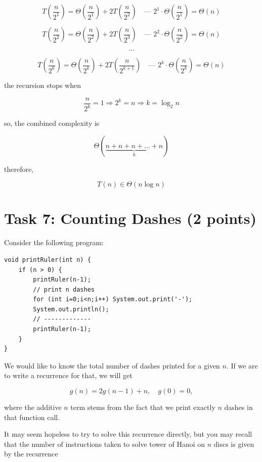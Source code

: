 \documentclass{article}
\theoremstyle{remark}
\begin{document}
\begin{enumerate*}
        \[T(\frac{n}{2^1}) = \Theta(\frac{n}{2^1}) + 2T(\frac{n}{2^2})
        \quad \text{--- } 2^1 \cdot \Theta(\frac{n}{2^1}) = \Theta(n)\]

        \[T(\frac{n}{2^2}) = \Theta(\frac{n}{2^2}) + 2T(\frac{n}{2^3})
        \quad \text{--- } 2^2 \cdot \Theta(\frac{n}{2^2}) = \Theta(n)\]

        \[...\]

        \[T(\frac{n}{2^k}) = \Theta(\frac{n}{2^k}) + 2T(\frac{n}{2^{k+1}})
        \quad \text{--- } 2^k \cdot \Theta(\frac{n}{2^k}) = \Theta(n)\]

        the recursion stops when

        \[\frac{n}{2^k} = 1 \Rightarrow 2^k = n \Rightarrow k = \log_2 n\]

        so, the combined complexity is

        \[
        \Theta(\underbrace{n + n + n + ... + n}_{k})
        \]

        therefore,

        \[\boxed{T(n) \in \Theta(n\log n)}\]


\end{enumerate*}

\vspace{1em}
\hrulefill

\section*{Task 7: Counting Dashes (2 points)}

Consider the following program:

\begin{verbatim}
void printRuler(int n) {
    if (n > 0) {
        printRuler(n-1);
        // print n dashes
        for (int i=0;i<n;i++) System.out.print('-');
        System.out.println();
        // -------------
        printRuler(n-1);
    }
}
\end{verbatim}

We would like to know the total number of dashes printed for a given $n$. If we are to write a recurrence for that, we will get

\[ g(n) = 2g(n - 1) + n, \quad g(0) = 0, \]

where the additive $n$ term stems from the fact that we print exactly $n$ dashes in that function call.

It may seem hopeless to try to solve this recurrence directly, but you may recall that the number of instructions taken to solve tower of Hanoi on $n$ discs is given by the recurrence
\end{document}
